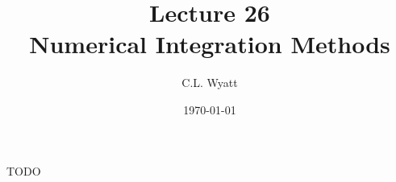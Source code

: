 \documentclass{article}
\begin{document}
\title{Lecture 26\\Numerical Integration Methods}
\author{C.L. Wyatt}
\date{\today}
\maketitle

TODO
\end{document}
